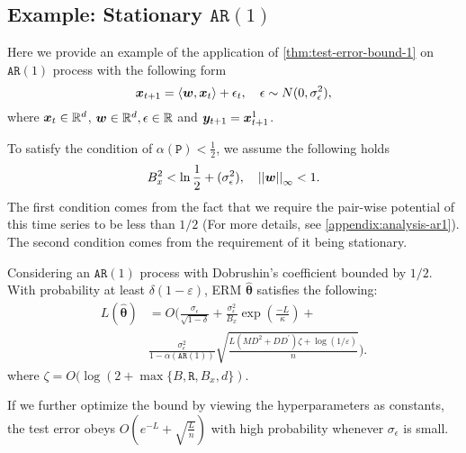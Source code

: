 \subsection{Example: Stationary $\mathtt{AR}(1)$}\label{sec:AR1}
Here we provide an example of the application of \cref{thm:test-error-bound-1} on $\mathtt{AR}(1)$ process with the following form
\begin{equation*}
    \bm{x}_{t+1}
    =
    \langle \bm{w}, \bm{x}_{t} \rangle + \epsilon_t, \quad \epsilon \sim N(0, \sigma_{\epsilon}^2),
\end{equation*}
where $\bm{x}_t \in \mathbb{R}^d$, $\bm{w} \in \mathbb{R}^d, \epsilon \in \mathbb{R}$ and $\bm{y}_{t+1} = \bm{x}_{t+1}^1$.

To satisfy the condition of $\alpha( \mathtt{P} ) < \frac{1}{2}$, we assume the following holds
\begin{equation}\label{eqn:condition-weakly-dependent-AR1}
    B_x^2 < \ln \frac{1}{2} + ( \sigma_{\epsilon}^2 ),
    \quad  \left\lvert \left\lvert\bm{w}\right\rvert \right\rvert_{\infty} < 1.
\end{equation}
The first condition comes from the fact that we require the pair-wise potential of this time series to be less than $1/2$ (For more details, see \cref{appendix:analysis-ar1}).
The second condition comes from the requirement of it being stationary.
\begin{proposition}\label{proposition:ar1}
    Considering an $\mathtt{AR}(1)$ process with Dobrushin's coefficient bounded by $1/2$.
    With probability at least $\delta(1 - \varepsilon)$, ERM $\hat{\bm{\theta}}$ satisfies the following:
    \begin{align*}
    L(\hat{\bm{\theta}})
    &=
    O
    \Bigg(
    \frac{\sigma_\epsilon}{\sqrt{1 - \delta}}
    +
    \frac{\sigma_\epsilon^2}{B_x}
    \exp \left( \frac{-L}{\kappa} \right)
    +
    \\
    &
    \frac{\sigma_\epsilon^2}{1 - \alpha( \mathtt{AR}(1) )}
    \sqrt{ \frac{L(MD^2 + D D^\prime) \zeta + \log (1 / \varepsilon)}{n} }
    \Bigg).
    \end{align*}
    where $\zeta = O(\log(2 + \max \{ B, \mathtt{R}, B_x, d \})$. 
\end{proposition}
If we further optimize the bound by viewing the hyperparameters as constants, the test error obeys $O(e^{-L} + \sqrt{\frac{L}{n}})$ with high probability whenever $\sigma_\epsilon$ is small.
